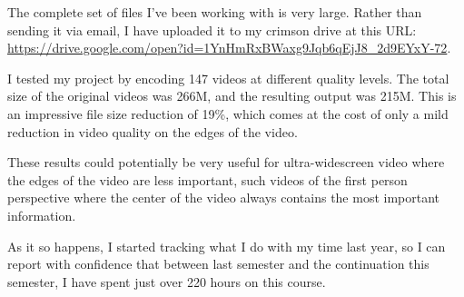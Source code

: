 \documentclass[11pt,oneside,letterpaper]{article}
\begin{document}
The complete set of files I've been working with is very large. Rather than
sending it via email, I have uploaded it to my crimson drive at this URL:
\url{https://drive.google.com/open?id=1YnHmRxBWaxg9Jqb6qEjJ8_2d9EYxY-72}.

I tested my project by encoding 147 videos at different quality levels. The
total size of the original videos was 266M, and the resulting output was
215M. This is an impressive file size reduction of 19\%, which comes at the cost
of only a mild reduction in video quality on the edges of the video.

These results could potentially be very useful for ultra-widescreen video where
the edges of the video are less important, such videos of the first person
perspective where the center of the video always contains the most important
information.

As it so happens, I started tracking what I do with my time last year, so I can
report with confidence that between last semester and the continuation this
semester, I have spent just over 220 hours on this course.
\end{document}
